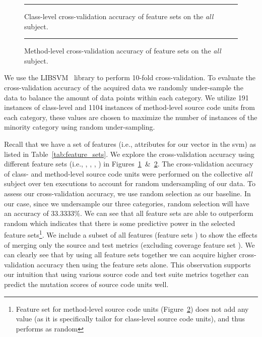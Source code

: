 \begin{figure}[!tb]
  \centering
  \begin{adjustbox}{max size={.95\textwidth}{.95\textheight}}
    
  \end{adjustbox}
  \caption{Class-level cross-validation accuracy of feature sets on the \emph{all} subject.}
  \vspace{2mm}
  \hrule
  \label{fig:all_cross_validation_features_class_graph}
\end{figure}

\begin{figure}[!tb]
  \centering
  \begin{adjustbox}{max size={.95\textwidth}{.95\textheight}}
    
  \end{adjustbox}
  \caption{Method-level cross-validation accuracy of feature sets on the \emph{all} subject.}
  \vspace{2mm}
  \hrule
  \label{fig:all_cross_validation_features_method_graph}
\end{figure}

We use the LIBSVM~\cite{CL11} library to perform 10-fold cross-validation. To evaluate the cross-validation accuracy of the acquired data we randomly under-sample the data to balance the amount of data points within each category. We utilize 191 instances of class-level and 1104 instances of method-level source code units from each category, these values are chosen to maximize the number of instances of the minority category using random under-sampling.

Recall that we have a set of features (i.e., attributes for our vector in the \gls{svm}) as listed in Table~\ref{tab:feature_sets}. We explore the cross-validation accuracy using different feature sets (i.e., , , , ) in Figures~\ref{fig:all_cross_validation_features_class_graph}~\&~\ref{fig:all_cross_validation_features_method_graph}. The cross-validation accuracy of class- and method-level source code units were performed on the collective \emph{all} subject over ten executions to account for random undersampling of our data. To assess our cross-validation accuracy, we use random selection as our baseline. In our case, since we undersample our three categories, random selection will have an accuracy of 33.3333\%. We can see that all feature sets are able to outperform random which indicates that there is some predictive power in the selected feature sets\footnote{Feature set  for method-level source code units (Figure~\ref{fig:all_cross_validation_features_method_graph}) does not add any value (as it is specifically tailor for class-level source code units), and thus performs as random}. We include a subset of all features (feature sets   ) to show the effects of merging only the source and test metrics (excluding coverage feature set ). We can clearly see that by using all feature sets together we can acquire higher cross-validation accuracy then using the feature sets alone. This observation supports our intuition that using various source code and test suite metrics together can predict the mutation scores of source code units well.

